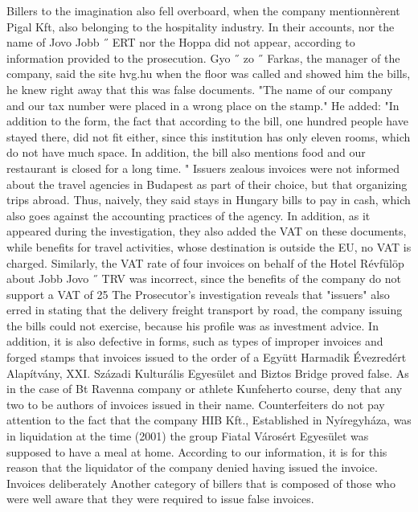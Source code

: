 Billers to the imagination also fell overboard, when the company mentionnèrent Pigal Kft, also belonging to the hospitality industry. In their accounts, nor the name of Jovo Jobb ˝ ERT nor the Hoppa did not appear, according to information provided to the prosecution.
Gyo ˝ zo ˝ Farkas, the manager of the company, said the site hvg.hu when the floor was called and showed him the bills, he knew right away that this was false documents.
"The name of our company and our tax number were placed in a wrong place on the stamp."
He added: "In addition to the form, the fact that according to the bill, one hundred people have stayed there, did not fit either, since this institution has only eleven rooms, which do not have much space.
In addition, the bill also mentions food and our restaurant is closed for a long time. "
Issuers zealous invoices were not informed about the travel agencies in Budapest as part of their choice, but that organizing trips abroad. Thus, naively, they said stays in Hungary bills to pay in cash, which also goes against the accounting practices of the agency.
In addition, as it appeared during the investigation, they also added the VAT on these documents, while benefits for travel activities, whose destination is outside the EU, no VAT is charged.
Similarly, the VAT rate of four invoices on behalf of the Hotel Révfülöp about Jobb Jovo ˝ TRV was incorrect, since the benefits of the company do not support a VAT of 25%
The Prosecutor's investigation reveals that "issuers" also erred in stating that the delivery freight transport by road, the company issuing the bills could not exercise, because his profile was as investment advice.
In addition, it is also defective in forms, such as types of improper invoices and forged stamps that invoices issued to the order of a Együtt Harmadik Évezredért Alapítvány, XXI. Századi Kulturális Egyesület and Biztos Bridge proved false.
As in the case of Bt Ravenna company or athlete Kunfeherto course, deny that any two to be authors of invoices issued in their name.
Counterfeiters do not pay attention to the fact that the company HIB Kft., Established in Nyíregyháza, was in liquidation at the time (2001) the group Fiatal Városért Egyesület was supposed to have a meal at home. According to our information, it is for this reason that the liquidator of the company denied having issued the invoice.
Invoices deliberately
Another category of billers that is composed of those who were well aware that they were required to issue false invoices.
